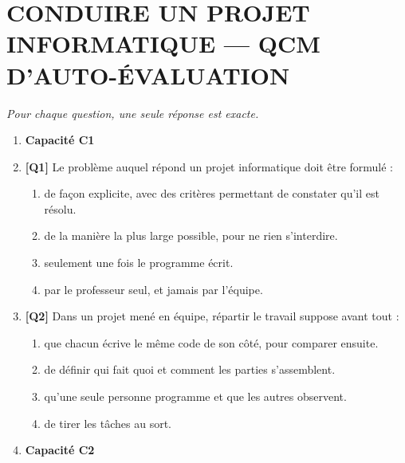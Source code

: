 
\section*{\textcolor{chapcolor}{\MakeUppercase{Conduire un projet informatique — QCM d'auto-évaluation}}}

\begin{center}
\textit{Pour chaque question, une seule réponse est exacte.}
\end{center}

\begin{enumerate}

\item[] \textbf{Capacité C1}

\item \textbf{[Q1]} Le problème auquel répond un projet informatique doit être formulé :
  \begin{enumerate}[label=\Alph*.]
    \item de façon explicite, avec des critères permettant de constater qu'il est résolu.
    \item de la manière la plus large possible, pour ne rien s'interdire.
    \item seulement une fois le programme écrit.
    \item par le professeur seul, et jamais par l'équipe.
  \end{enumerate}

\item \textbf{[Q2]} Dans un projet mené en équipe, répartir le travail suppose avant tout :
  \begin{enumerate}[label=\Alph*.]
    \item que chacun écrive le même code de son côté, pour comparer ensuite.
    \item de définir qui fait quoi et comment les parties s'assemblent.
    \item qu'une seule personne programme et que les autres observent.
    \item de tirer les tâches au sort.
  \end{enumerate}

\item[] \textbf{Capacité C2}


\end{enumerate}
